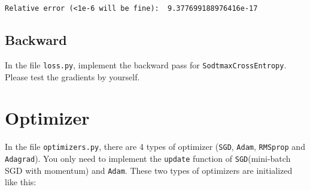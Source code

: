 \documentclass[11pt]{article}
\begin{document}
    \begin{Verbatim}[commandchars=\\\{\}]
Relative error (<1e-6 will be fine):  9.377699188976416e-17

    \end{Verbatim}

    \subsection{Backward}\label{backward}

In the file \texttt{loss.py}, implement the backward pass for
\texttt{SodtmaxCrossEntropy}. Please test the gradients by yourself.

    \section{Optimizer}\label{optimizer}

In the file \texttt{optimizers.py}, there are 4 types of optimizer
(\texttt{SGD}, \texttt{Adam}, \texttt{RMSprop} and \texttt{Adagrad}).
You only need to implement the \texttt{update} function of
\texttt{SGD}(mini-batch SGD with momentum) and \texttt{Adam}. These two
types of optimizers are initialized like this:
\end{document}
